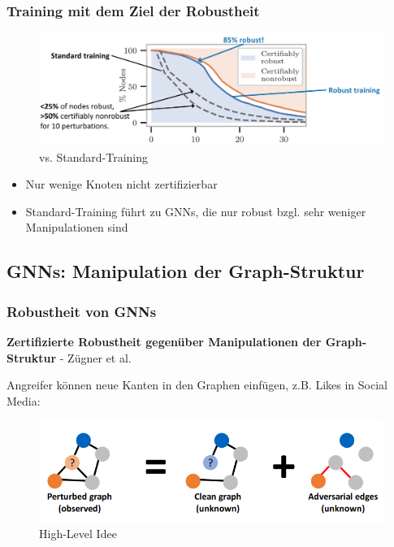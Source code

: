 \documentclass{beamer}
\begin{document}
\begin{frame}
  \frametitle{Training mit dem Ziel der Robustheit}
  \begin{figure}
    \centering
    \includegraphics[width=\textwidth]{img/robust_training.png}
    \caption*{ vs. Standard-Training \cite{Zuegner_2019}}
  \end{figure}
  \begin{itemize}
    \item Nur wenige Knoten nicht zertifizierbar
    \item Standard-Training führt zu GNNs, die nur robust bzgl. sehr weniger Manipulationen sind
  \end{itemize}
\end{frame}

\subsection{GNNs: Manipulation der Graph-Struktur}

\begin{frame}
  \frametitle{Robustheit von GNNs}
  \textbf{Zertifizierte Robustheit gegenüber Manipulationen der Graph-Struktur} - Zügner et al. \cite{10.1145/3394486.3403217}\newline

  Angreifer können neue Kanten in den Graphen einfügen, z.B. Likes in Social Media:
  \begin{figure}
    \centering
    \includegraphics[width=\textwidth]{img/high_level_graph_pert.png}
    \caption*{High-Level Idee \cite{10.1145/3394486.3403217}}
  \end{figure}
\end{frame}
\end{document}
